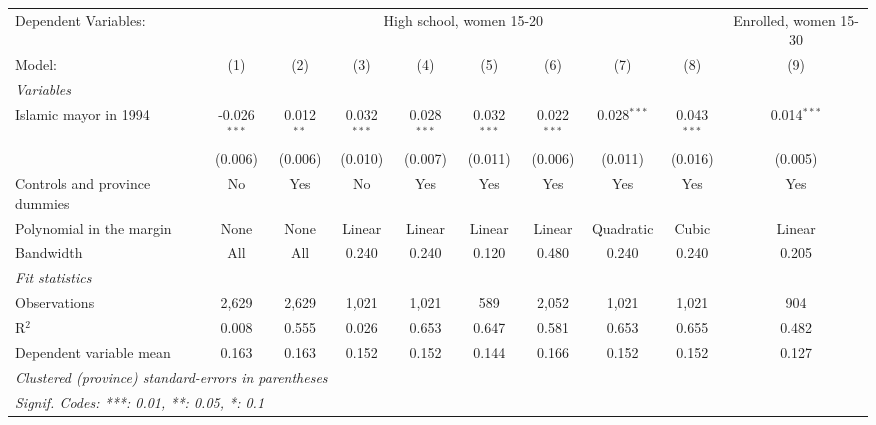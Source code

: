 
\begingroup
\centering
\begin{adjustbox}{max width=\textwidth}
   \begin{tabular}{lccccccccc}
      \tabularnewline \midrule \midrule
      Dependent Variables: & \multicolumn{8}{c}{High school, women 15-20} & Enrolled, women 15-30\\
      Model:                        & (1)            & (2)          & (3)           & (4)           & (5)           & (6)           & (7)           & (8)           & (9)\\  
      \midrule
      \emph{Variables}\\
      Islamic mayor in 1994         & -0.026$^{***}$ & 0.012$^{**}$ & 0.032$^{***}$ & 0.028$^{***}$ & 0.032$^{***}$ & 0.022$^{***}$ & 0.028$^{***}$ & 0.043$^{***}$ & 0.014$^{***}$\\   
                                    & (0.006)        & (0.006)      & (0.010)       & (0.007)       & (0.011)       & (0.006)       & (0.011)       & (0.016)       & (0.005)\\   
      Controls and province dummies & No             & Yes          & No            & Yes           & Yes           & Yes           & Yes           & Yes           & Yes\\  
      Polynomial in the margin      & None           & None         & Linear        & Linear        & Linear        & Linear        & Quadratic     & Cubic         & Linear\\  
      Bandwidth                     & All            & All          & 0.240         & 0.240         & 0.120         & 0.480         & 0.240         & 0.240         & 0.205\\  
      \midrule
      \emph{Fit statistics}\\
      Observations                  & 2,629          & 2,629        & 1,021         & 1,021         & 589           & 2,052         & 1,021         & 1,021         & 904\\  
      R$^2$                         & 0.008          & 0.555        & 0.026         & 0.653         & 0.647         & 0.581         & 0.653         & 0.655         & 0.482\\  
      Dependent variable mean       & 0.163          & 0.163        & 0.152         & 0.152         & 0.144         & 0.166         & 0.152         & 0.152         & 0.127\\  
      \midrule \midrule
      \multicolumn{10}{l}{\emph{Clustered (province) standard-errors in parentheses}}\\
      \multicolumn{10}{l}{\emph{Signif. Codes: ***: 0.01, **: 0.05, *: 0.1}}\\
   \end{tabular}
\end{adjustbox}
\par\endgroup


